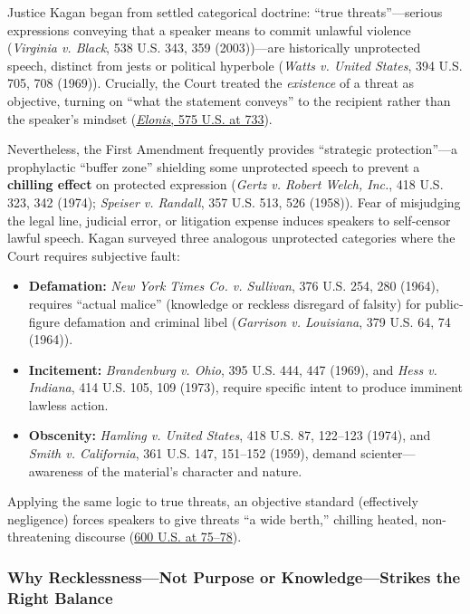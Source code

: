 \documentclass[12pt]{article}
\begin{document}
Justice Kagan began from settled categorical doctrine: ``true threats''---serious expressions conveying that a speaker means to commit unlawful violence (\textit{Virginia v. Black}, 538 U.S. 343, 359 (2003))---are historically unprotected speech, distinct from jests or political hyperbole (\textit{Watts v. United States}, 394 U.S. 705, 708 (1969)). Crucially, the Court treated the \textit{existence} of a threat as objective, turning on ``what the statement conveys'' to the recipient rather than the speaker's mindset (\href{https://supreme.justia.com/cases/federal/us/575/723/}{\textit{Elonis}, 575 U.S. at 733}).

Nevertheless, the First Amendment frequently provides ``strategic protection''---a prophylactic ``buffer zone'' shielding some unprotected speech to prevent a \textbf{chilling effect} on protected expression (\textit{Gertz v. Robert Welch, Inc.}, 418 U.S. 323, 342 (1974); \textit{Speiser v. Randall}, 357 U.S. 513, 526 (1958)). Fear of misjudging the legal line, judicial error, or litigation expense induces speakers to self-censor lawful speech. Kagan surveyed three analogous unprotected categories where the Court requires subjective fault:
\begin{itemize}
  \item \textbf{Defamation:} \textit{New York Times Co. v. Sullivan}, 376 U.S. 254, 280 (1964), requires ``actual malice'' (knowledge or reckless disregard of falsity) for public-figure defamation and criminal libel (\textit{Garrison v. Louisiana}, 379 U.S. 64, 74 (1964)).
  \item \textbf{Incitement:} \textit{Brandenburg v. Ohio}, 395 U.S. 444, 447 (1969), and \textit{Hess v. Indiana}, 414 U.S. 105, 109 (1973), require specific intent to produce imminent lawless action.
  \item \textbf{Obscenity:} \textit{Hamling v. United States}, 418 U.S. 87, 122--123 (1974), and \textit{Smith v. California}, 361 U.S. 147, 151--152 (1959), demand scienter---awareness of the material's character and nature.
\end{itemize}
Applying the same logic to true threats, an objective standard (effectively negligence) forces speakers to give threats ``a wide berth,'' chilling heated, non-threatening discourse (\href{https://supreme.justia.com/cases/federal/us/600/22-138/}{600 U.S. at 75--78}).

\subsubsection{Why Recklessness---Not Purpose or Knowledge---Strikes the Right Balance}
\end{document}
